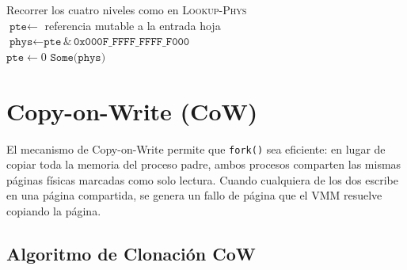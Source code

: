 \documentclass[11pt,twoside,openright]{book}
\theoremstyle{definition}
\theoremstyle{plain}
\theoremstyle{remark}
\begin{document}
\begin{algorithm}[H]
\caption{\textsc{Unmap-Page}: Desmapear una página virtual}
\label{alg:unmap-page}
Recorrer los cuatro niveles como en \textsc{Lookup-Phys} \\
$\texttt{pte} \leftarrow$ referencia mutable a la entrada hoja \\
$\texttt{phys} \leftarrow \texttt{pte} \,\texttt{\&}\, \texttt{0x000F\_FFFF\_FFFF\_F000}$ \\
$\texttt{pte} \leftarrow 0$ 
\Return $\texttt{Some(phys)}$
\end{algorithm}

\section{Copy-on-Write (CoW)}
\label{sec:cow}

El mecanismo de Copy-on-Write permite que \texttt{fork()} sea eficiente: en lugar
de copiar toda la memoria del proceso padre, ambos procesos comparten las mismas
páginas físicas marcadas como solo lectura. Cuando cualquiera de los dos escribe
en una página compartida, se genera un fallo de página que el VMM resuelve
copiando la página.

\subsection{Algoritmo de Clonación CoW}
\end{document}
